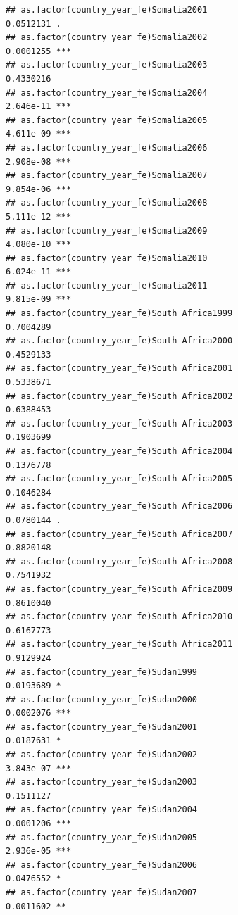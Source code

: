 \documentclass[
  a4paper,
]{article}
\begin{document}
\begin{verbatim}
## as.factor(country_year_fe)Somalia2001                          0.0512131 .  
## as.factor(country_year_fe)Somalia2002                          0.0001255 ***
## as.factor(country_year_fe)Somalia2003                          0.4330216    
## as.factor(country_year_fe)Somalia2004                          2.646e-11 ***
## as.factor(country_year_fe)Somalia2005                          4.611e-09 ***
## as.factor(country_year_fe)Somalia2006                          2.908e-08 ***
## as.factor(country_year_fe)Somalia2007                          9.854e-06 ***
## as.factor(country_year_fe)Somalia2008                          5.111e-12 ***
## as.factor(country_year_fe)Somalia2009                          4.080e-10 ***
## as.factor(country_year_fe)Somalia2010                          6.024e-11 ***
## as.factor(country_year_fe)Somalia2011                          9.815e-09 ***
## as.factor(country_year_fe)South Africa1999                     0.7004289    
## as.factor(country_year_fe)South Africa2000                     0.4529133    
## as.factor(country_year_fe)South Africa2001                     0.5338671    
## as.factor(country_year_fe)South Africa2002                     0.6388453    
## as.factor(country_year_fe)South Africa2003                     0.1903699    
## as.factor(country_year_fe)South Africa2004                     0.1376778    
## as.factor(country_year_fe)South Africa2005                     0.1046284    
## as.factor(country_year_fe)South Africa2006                     0.0780144 .  
## as.factor(country_year_fe)South Africa2007                     0.8820148    
## as.factor(country_year_fe)South Africa2008                     0.7541932    
## as.factor(country_year_fe)South Africa2009                     0.8610040    
## as.factor(country_year_fe)South Africa2010                     0.6167773    
## as.factor(country_year_fe)South Africa2011                     0.9129924    
## as.factor(country_year_fe)Sudan1999                            0.0193689 *  
## as.factor(country_year_fe)Sudan2000                            0.0002076 ***
## as.factor(country_year_fe)Sudan2001                            0.0187631 *  
## as.factor(country_year_fe)Sudan2002                            3.843e-07 ***
## as.factor(country_year_fe)Sudan2003                            0.1511127    
## as.factor(country_year_fe)Sudan2004                            0.0001206 ***
## as.factor(country_year_fe)Sudan2005                            2.936e-05 ***
## as.factor(country_year_fe)Sudan2006                            0.0476552 *  
## as.factor(country_year_fe)Sudan2007                            0.0011602 ** 

\end{verbatim}
\end{document}

